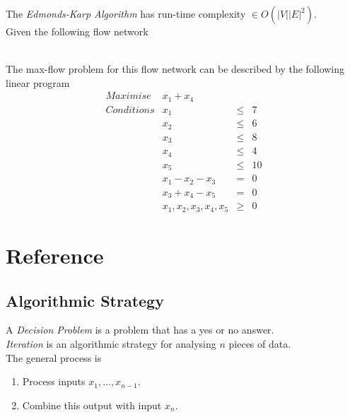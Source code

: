 \documentclass[11pt,a4paper]{article}
\begin{document}
The \textit{Edmonds-Karp Algorithm} has run-time complexity $\in O(|V||E|^2)$.\\

Given the following flow network\\
\\
The max-flow problem for this flow network can be described by the following linear program
\[\begin{array}{rrcl}
Maximise&x_1+x_4&&\\
Conditions&x_1&\leq&7\\
&x_2&\leq&6\\
&x_3&\leq&8\\
&x_4&\leq&4\\
&x_5&\leq&10\\
&x_1-x_2-x_3&=&0\\
&x_3+x_4-x_5&=&0\\
&x_1,x_2,x_3,x_4,x_5&\geq& 0
\end{array}\]

\newpage
\section{Reference}

\subsection{Algorithmic Strategy}

A \textit{Decision Problem} is a problem that has a yes or no answer.\\

\textit{Iteration} is an algorithmic strategy for analysing $n$ pieces of data.\\
The general process is
\begin{enumerate}[label=\roman*)]
  \item Process inputs $x_1, \dots, x_{n-1}$.
  \item Combine this output with input $x_n$.
\end{enumerate}
\end{document}
